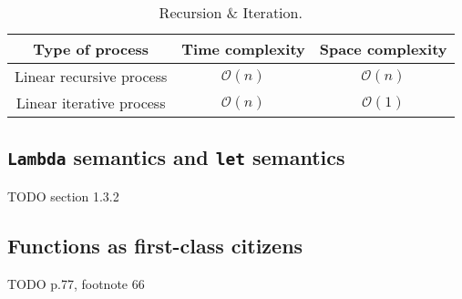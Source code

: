 \documentclass{article}
\begin{document}
\begin{table}[h]
    \centering
    \begin{tabular}{|c|c|c|}
         \hline
         Type of process & Time complexity & Space complexity \\
         \hline
         Linear recursive process & $\mathcal{O}(n)$ & $\mathcal{O}(n)$ \\
         \hline
         Linear iterative process & $\mathcal{O}(n)$ & $\mathcal{O}(1)$ \\
         \hline
    \end{tabular}
    \caption{Recursion \& Iteration.}
    \label{tab:rec_iter}
\end{table}

\subsection*{\texttt{Lambda} semantics and \texttt{let} semantics}
TODO section 1.3.2

\subsection*{Functions as first-class citizens}

TODO p.77, footnote 66



\printbibliography
\end{document}
